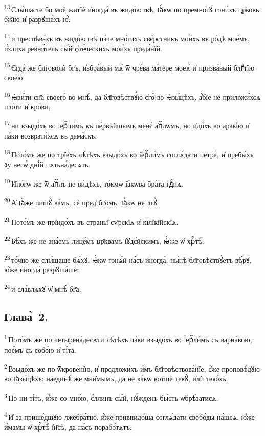 \textsuperscript{13}\,Слы́шасте бо моѐ житїѐ и҆ногда̀ въ жидо́вствѣ, ꙗ҆́кѡ по премно́гꙋ гони́хъ цр҃ковь бж҃їю и҆ разрꙋша́хъ ю҆̀:

\textsuperscript{14}\,и҆ преспѣва́хъ въ жидо́вствѣ па́че мно́гихъ свє́рстникъ мои́хъ въ ро́дѣ мое́мъ, и҆́злиха ревни́тель сы́й ѻ҆те́ческихъ мои́хъ преда́нїй.

\textsuperscript{15}\,Є҆гда́ же бл҃говолѝ бг҃ъ, и҆збра́вый мѧ̀ ѿ чре́ва ма́тере моеѧ̀ и҆ призва́вый блгⷣтїю свое́ю,

\textsuperscript{16}\,ꙗ҆ви́ти сн҃а своего̀ во мнѣ̀, да бл҃говѣствꙋ́ю є҆го̀ во ꙗ҆зы́цѣхъ, а҆́бїе не приложи́хсѧ пло́ти и҆ кро́ви,

\textsuperscript{17}\,ни взыдо́хъ во і҆ерⷭ҇ли́мъ къ пе́рвѣйшымъ менє̀ а҆пⷭ҇лѡмъ, но и҆до́хъ во а҆раві́ю и҆ па́ки возврати́хсѧ въ дама́скъ.

\textsuperscript{18}\,Пото́мъ же по трїе́хъ лѣ́тѣхъ взыдо́хъ во і҆ерⷭ҇ли́мъ соглѧ́дати петра̀, и҆ пребы́хъ ᲂу҆ негѡ̀ дні́й пѧтьна́десѧть.

\textsuperscript{19}\,И҆но́гѡ же ѿ а҆пⷭ҇лъ не ви́дѣхъ, то́кмѡ і҆а́кѡва бра́та гдⷭ҇нѧ.

\textsuperscript{20}\,А҆ ꙗ҆̀же пишꙋ̀ ва́мъ, сѐ пред̾ бг҃омъ, ꙗ҆́кѡ не лгꙋ̀.

\textsuperscript{21}\,Пото́мъ же прїидо́хъ въ страны̑ сѵ̑рскїѧ и҆ кїлїкі̑йскїѧ.

\textsuperscript{22}\,Бѣ́хъ же не зна́емь лице́мъ цр҃квамъ і҆ꙋдє́йскимъ, ꙗ҆̀же ѡ҆ хрⷭ҇тѣ̀:

\textsuperscript{23}\,то́чїю же слы́шаще бѧ́хꙋ, ꙗ҆́кѡ гонѧ́й на́съ и҆ногда̀, ны́нѣ бл҃говѣствꙋ́етъ вѣ́рꙋ, ю҆́же и҆ногда̀ разрꙋша́ше:

\textsuperscript{24}\,и҆ сла́влѧхꙋ ѡ҆ мнѣ̀ бг҃а.

\subsection{Глава̀~2.}

\textsuperscript{1}\,Пото́мъ же по четырена́десѧти лѣ́тѣхъ па́ки взыдо́хъ во і҆ерⷭ҇ли́мъ съ варна́вою, пое́мъ съ собо́ю и҆ ті́та.

\textsuperscript{2}\,Взыдо́хъ же по ѿкрове́нїю, и҆ предложи́хъ и҆̀мъ бл҃говѣствова́нїе, є҆́же проповѣ́дꙋю во ꙗ҆зы́цѣхъ: наединѣ́ же мни̑мымъ, да не ка́кѡ вотщѐ текꙋ̀, и҆лѝ теко́хъ.

\textsuperscript{3}\,Но ни ті́тъ, и҆́же со мно́ю, є҆́ллинъ сы́й, нꙋ́жденъ бы́сть ѡ҆брѣ́затисѧ.

\textsuperscript{4}\,И҆ за прише́дшꙋю лжебра́тїю, и҆̀же привнидо́ша соглѧ́дати свобо́ды на́шеѧ, ю҆́же и҆́мамы ѡ҆ хрⷭ҇тѣ̀ і҆и҃сѣ, да на́съ порабо́тѧтъ:

